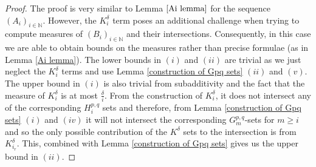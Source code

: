 \documentclass[12pt]{article}
\begin{document}
\begin{proof}
The proof is very similar to Lemma $\ref{Ai lemma}$ for the sequence $(A_i)_{i \in \mathbb{N}}$. However, the $K_i^{\delta}$ term poses an additional challenge when trying to compute measures of $(B_i)_{i \in \mathbb{N}}$ and their intersections. Consequently, in this case we are able to obtain bounds on the measures rather than precise formulae (as in Lemma \ref{Ai lemma}). The lower bounds in $(i)$ and $(ii)$ are trivial as we just neglect the $K_i^{\delta}$ terms and use Lemma \ref{construction of Gpq sets} $(ii)$ and $(v)$. The upper bound in $(i)$ is also trivial from subadditivity and the fact that the measure of $K_i^\delta$ is at most
$\frac{\delta}{i}$. From the construction of $K_i^\delta$, it does not intersect any of the corresponding $H_i^{p,q}$ sets and therefore, from Lemma \ref{construction of Gpq sets} $(i)$ and $(iv)$ it will not intersect the corresponding $G_m^{p,q}$-sets for $m \geq i$ and so the only possible contribution of the $K^\delta$ sets to the intersection is from $K_{i_r}^\delta$. This, combined with Lemma \ref{construction of Gpq sets} gives us the upper bound in $(ii)$.





\end{proof}
\end{document}
